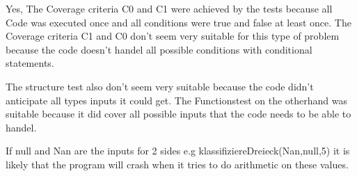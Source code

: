 \begin{parlist}
\item Yes, The Coverage criteria C0 and C1 were achieved by the tests because all Code was executed once and all conditions were true and false at least once. The Coverage criteria C1 and C0 don't seem very suitable for this type of problem because the code doesn't handel all possible conditions with conditional statements.
\item The structure test also don't seem very suitable because the code didn't anticipate all types inputs it could get. The Functionstest on the otherhand was suitable because it did cover all possible inputs that the code needs to be able to handel.
\item If null and Nan are the inputs for 2 sides e.g klassifiziereDreieck(Nan,null,5) it is likely that the program will crash when it tries to do arithmetic on these values.

\end{parlist}
